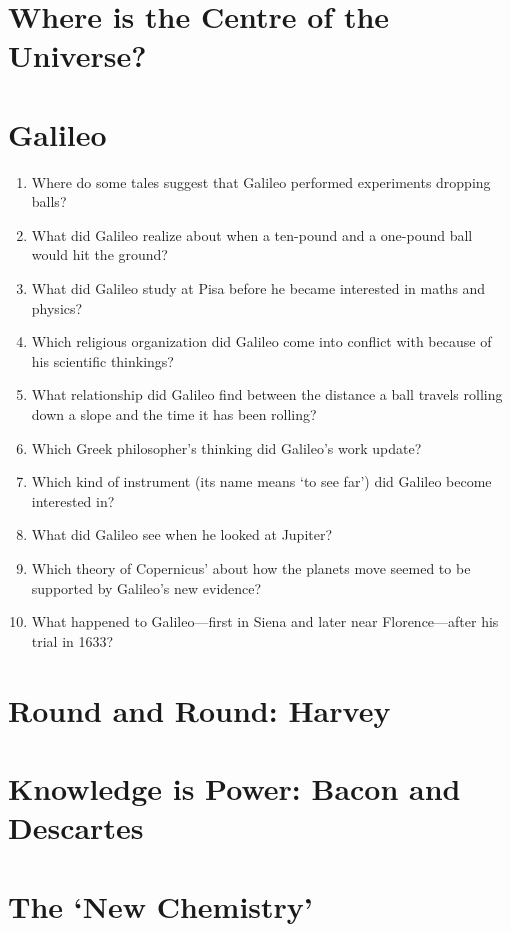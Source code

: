 \documentclass[a4paper,12pt]{article}
\begin{document}
\section{Where is the Centre of the Universe?} %

\section{Galileo} %

\begin{enumerate}
\item Where do some tales suggest that Galileo performed experiments dropping balls?
\item What did Galileo realize about when a ten-pound and a one-pound ball would hit the ground?
\item What did Galileo study at Pisa before he became interested in maths and physics?
\item Which religious organization did Galileo come into conflict with because of his scientific thinkings?
\item What relationship did Galileo find between the distance a ball travels rolling down a slope and the time it has been rolling?
\item Which Greek philosopher's thinking did Galileo's work update?
\item Which kind of instrument (its name means `to see far') did Galileo become interested in?
\item What did Galileo see when he looked at Jupiter?
\item Which theory of Copernicus' about how the planets move seemed to be supported by Galileo's new evidence?
\item What happened to Galileo---first in Siena and later near Florence---after his trial in 1633?
\end{enumerate}

\section{Round and Round: Harvey} %

\section{Knowledge is Power: Bacon and Descartes} %

\section{The `New Chemistry'} %
\end{document}
